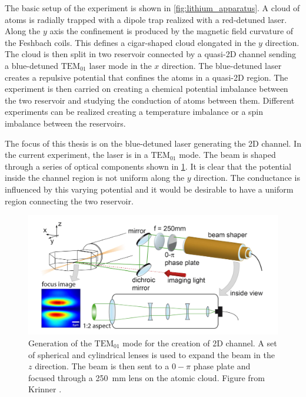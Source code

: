 The basic setup of the experiment is shown in \cref{fig:lithium_apparatus}. A cloud of atoms is radially trapped with a dipole trap realized with a red-detuned laser. Along the $y$ axis the confinement is produced by the magnetic field curvature of the Feshbach coils. This defines a cigar-shaped cloud elongated in the $y$ direction. The cloud is then split in two reservoir connected by a quasi-2D channel sending a blue-detuned $\text{TEM}_{01}$ laser mode in the $x$ direction. The blue-detuned laser creates a repulsive potential that confines the atoms in a quasi-2D region. The experiment is then carried on creating a chemical potential imbalance between the two reservoir and studying the conduction of atoms between them. Different experiments can be realized creating a temperature imbalance or a spin imbalance between the reservoirs.

The focus of this thesis is on the blue-detuned laser generating the 2D channel. In the current experiment, the laser is in a $\text{TEM}_{01}$ mode. The beam is shaped through a series of optical components shown in \cref{fig:beam_shaper}. It is clear that the potential inside the channel region is not uniform along the $y$ direction. The conductance is influenced by this varying potential and it would be desirable to have a uniform region connecting the two reservoir.

\begin{figure}
    \includegraphics[width=\textwidth]{chapters/chapter_1/figures/beam_shaper.png}
    \caption[short]{Generation of the $\text{TEM}_{01}$ mode for the creation of 2D channel. A set of spherical and cylindrical lenses is used to expand the beam in the $z$ direction. The beam is then sent to a $0-\pi$ phase plate and focused through a \SI{250}{mm} lens on the atomic cloud. Figure from Krinner \cite{krinner2015b}.}
    \label{fig:beam_shaper}
\end{figure}


